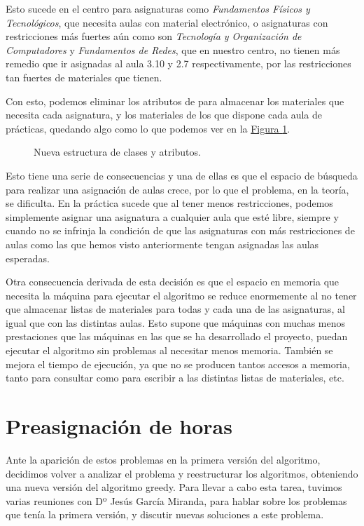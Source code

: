 Esto sucede en el centro para asignaturas como \textit{Fundamentos Físicos y Tecnológicos}, que necesita aulas con material electrónico, o asignaturas con restricciones más fuertes aún como son \textit{Tecnología y Organización de Computadores} y \textit{Fundamentos de Redes}, que en nuestro centro, no tienen más remedio que ir asignadas al aula 3.10 y 2.7 respectivamente, por las restricciones tan fuertes de materiales que tienen.

Con esto, podemos eliminar los atributos de para almacenar los materiales que necesita cada asignatura, y los materiales de los que dispone cada aula de prácticas, quedando algo como lo que podemos ver en la \hyperref[clases3]{Figura \ref*{clases3}}.

\begin{figure}[H]
  
  \caption{Nueva estructura de clases y atributos.}
  \label{clases3}
\end{figure}

Esto tiene una serie de consecuencias y una de ellas es que el espacio de búsqueda para realizar una asignación de aulas crece, por lo que el problema, en la teoría, se dificulta. En la práctica sucede que al tener menos restricciones, podemos simplemente asignar una asignatura a cualquier aula que esté libre, siempre y cuando no se infrinja la condición de que las asignaturas con más restricciones de aulas como las que hemos visto anteriormente tengan asignadas las aulas esperadas.

Otra consecuencia derivada de esta decisión es que el espacio en memoria que necesita la máquina para ejecutar el algoritmo se reduce enormemente al no tener que almacenar listas de materiales para todas y cada una de las asignaturas, al igual que con las distintas aulas. Esto supone que máquinas con muchas menos prestaciones que las máquinas en las que se ha desarrollado el proyecto, puedan ejecutar el algoritmo sin problemas al necesitar menos memoria. También se mejora el tiempo de ejecución, ya que no se producen tantos accesos a memoria, tanto para consultar como para escribir a las distintas listas de materiales, etc.

\section{Preasignación de horas}
Ante la aparición de estos problemas en la primera versión del algoritmo, decidimos volver a analizar el problema y reestructurar los algoritmos, obteniendo una nueva versión del algoritmo greedy. Para llevar a cabo esta tarea, tuvimos varias reuniones con Dº Jesús García Miranda, para hablar sobre los problemas que tenía la primera versión, y discutir nuevas soluciones a este problema. 

